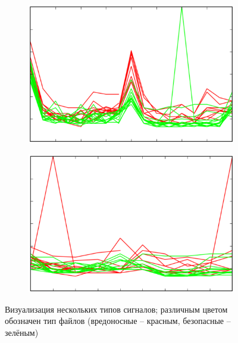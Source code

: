 \newpage
\begin{figure}[ht]
	\centering
    \begin{subfigure}[b]{0.45\textwidth}
    \centering
        \includegraphics[scale=0.3]{pasted-image-43.png}
        \caption{}
    \end{subfigure}
 	\begin{subfigure}[b]{0.45\textwidth}
    \centering
        \includegraphics[scale=0.3]{pasted-image-45.png}
        \caption{}
    \end{subfigure}
    \caption{Визуализация нескольких типов сигналов; различным цветом обозначен тип файлов (вредоносные -- красным, безопасные -- зелёным)}
    \label{fig_parsetree}
\end{figure}

